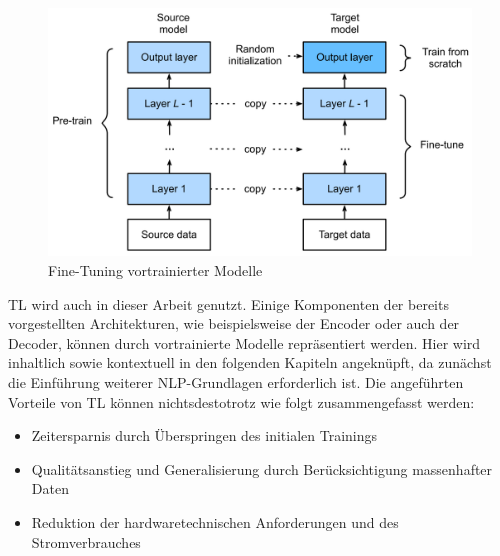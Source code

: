 \begin{figure}
  \centering
  \includegraphics[scale=0.4]{./source/images/finetuning.png}
  \caption{Fine-Tuning vortrainierter Modelle \cite[S.~555]{ZHA20}}
  \label{pic:FineTuning}
\end{figure}

\ac{TL} wird auch in dieser Arbeit genutzt. Einige Komponenten der bereits vorgestellten Architekturen, wie beispielsweise der Encoder oder auch der Decoder, können durch vortrainierte Modelle repräsentiert werden. Hier wird inhaltlich sowie kontextuell in den folgenden Kapiteln angeknüpft, da zunächst die Einführung weiterer \ac{NLP}-Grundlagen erforderlich ist. Die angeführten Vorteile von \ac{TL} können nichtsdestotrotz wie folgt zusammengefasst werden:

\begin{itemize}
	\item Zeitersparnis durch Überspringen des initialen Trainings
	\item Qualitätsanstieg und Generalisierung durch Berücksichtigung massenhafter Daten
	\item Reduktion der hardwaretechnischen Anforderungen und des Stromverbrauches
\end{itemize}

